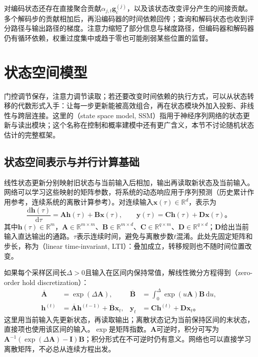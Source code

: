 对编码状态还存在直接聚合贡献$\alpha_{j,t}\bm{g}_{\mathrm{c}}^{(j)}$，以及该状态改变评分产生的间接贡献。多个解码步的贡献相加后，再沿编码器的时间依赖回传；查询和解码状态也收到评分路径与输出路径的梯度。注意力缩短了部分信息与梯度路径，但编码器和解码器仍有循环依赖，权重过度集中或趋于零也可能削弱某些位置的监督。

\section{状态空间模型}
\label{sec:rnn-state-space}

门控调节保存，注意力调节读取；若还要改变时间依赖的执行方式，可以从状态转移的代数形式入手：让每一步更新能被高效组合，再在状态模块外加入投影、非线性与跨层连接。这里的（state space model, SSM）指用于神经序列网络的状态更新与读出模块；这个名称在控制和概率建模中还有更广含义，本节不讨论随机状态估计的完整框架。

\subsection{状态空间表示与并行计算基础}
\label{sec:rnn-ssm-foundations}

线性状态更新分别映射旧状态与当前输入后相加，输出再读取新状态及当前输入。网络可以学习这些映射的矩阵参数，将系统的动态响应用于序列预测（历史累计作用参考，连续系统的离散计算参考）。对连续输入$\bm{x}(\tau)\in\mathbb{R}^{d}$，表示为
\begin{equation}
  \frac{\mathrm{d}\bm{h}(\tau)}{\mathrm{d}\tau}
    =\bm{A}\bm{h}(\tau)+\bm{B}\bm{x}(\tau),
  \qquad
  \bm{y}(\tau)=\bm{C}\bm{h}(\tau)+\bm{D}\bm{x}(\tau)\text{。}
  \label{eq:rnn-continuous-ssm}
\end{equation}
其中$\bm{h}(\tau)\in\mathbb{R}^{m}$，$\bm{A}\in\mathbb{R}^{m\times m}$、$\bm{B}\in\mathbb{R}^{m\times d}$、$\bm{C}\in\mathbb{R}^{q\times m}$、$\bm{D}\in\mathbb{R}^{q\times d}$；$\bm{D}$给出当前输入直达输出的通路。$\tau$表示连续时间，避免与离散步数$t$混淆。此处先固定矩阵和步长，称为（linear time-invariant, LTI）：叠加成立，转移规则也不随时间位置改变。

如果每个采样区间长$\Delta>0$且输入在区间内保持常值，解线性微分方程得到（zero-order hold discretization）：
\begin{equation}
  \begin{aligned}
    \overline{\bm{A}}&=\exp(\Delta\bm{A}),
    &\overline{\bm{B}}&=\int_0^{\Delta}\exp(u\bm{A})\bm{B}\,\mathrm{d}u,\\
    \bm{h}^{(t)}&=\overline{\bm{A}}\bm{h}^{(t-1)}
       +\overline{\bm{B}}\bm{x}_t,
    &\bm{y}_t&=\bm{C}\bm{h}^{(t)}+\bm{D}\bm{x}_t\text{。}
  \end{aligned}
  \label{eq:rnn-ssm-zoh}
\end{equation}
这里用当前输入先更新状态，再读取输出；离散状态记为当前保持区间的末状态，直接项也使用该区间的输入。$\exp$是矩阵指数。$\bm{A}$可逆时，积分可写为$\bm{A}^{-1}(\exp(\Delta\bm{A})-\bm{I})\bm{B}$；积分形式在不可逆时仍有意义。网络也可以直接学习离散矩阵，不必总从连续方程出发。

